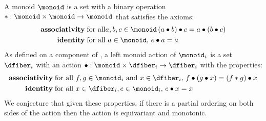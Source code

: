 \documentclass[../main.tex]{subfiles}
\begin{document}
A monoid \cite{Monoid2021} $\monoid$ is a set with a binary operation $\ast:\monoid \times \monoid\rightarrow \monoid$ that satisfies the axioms:
\begin{align*}
    \textbf{associativity}\; & \text{for all} a, b, c \in \monoid \, (a \bullet b) \bullet c = a \bullet (b \bullet c)\\
    \textbf{identity}\; & \text{for all } a\in \monoid,\,  e\bullet a = a 
\end{align*} 
As defined on a component of \dfiber, a left monoid action \cite{SemigroupAction2021,nlabauthorsAction2021} of $\monoid_i$ is a set $\dfiber_i$ with an action $\bullet: \monoid\times \dfiber_i \rightarrow \dfiber_i$ with the properties:
\begin{align*}
    \textbf{associativity}\;& \text{for all } f,g \in \monoid_i \text{ and } x\in \dfiber_i,\, f\bullet(g\bullet x) = (f\ast g) \bullet x\\
    \textbf{identity}\;& \text{for all } x\in \dfiber_i, e\in \monoid_i,\,  e\bullet x = x 
\end{align*}
We conjecture that given these properties, if there is a partial ordering on both sides of the action then the action is equivariant and monotonic.
\end{document}
